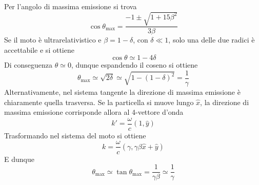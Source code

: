 \documentclass{article}
\begin{document}
\begin{enumerate}
	Per l'angolo di massima emissione si trova
	\[\cos\theta_\textrm{max}=\frac{-1\pm\sqrt{1+15\beta^2}}{3\beta}\]
	Se il moto è ultrarelativistico e $\beta=1-\delta$, con $\delta\ll1$, solo una delle due radici è accettabile e si ottiene
	\[\cos\theta\simeq1-4\delta\]
	Di conseguenza $\theta\simeq0$, dunque espandendo il coseno si ottiene
	\[\theta_\textrm{max}\simeq\sqrt{2\delta}\simeq\sqrt{1-(1-\delta)^2}=\frac{1}{\gamma}\]
	Alternativamente, nel sistema tangente la direzione di massima emissione è chiaramente quella trasversa. Se la particella si muove lungo $\hat{x}$, la direzione di massima emissione corrisponde allora al 4-vettore d'onda
	\[k'=\frac{\omega}{c}(1,\hat{y})\]
	Trasformando nel sistema del moto si ottiene
	\[k=\frac{\omega}{c}(\gamma,\gamma\beta\hat{x}+\hat{y})\]
	E dunque
	\[\theta_\textrm{max}\simeq\tan\theta_\textrm{max}=\frac{1}{\gamma\beta}\simeq\frac{1}{\gamma}\]
\end{enumerate}
\end{document}

